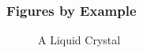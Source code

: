 \documentclass{beamer}
\begin{document}
\begin{frame}[containsverbatim]
    \frametitle{Figures by Example}
    \begin{figure}
        \begin{center} \vspace{-10pt}
            \label{CNematic}
            \caption{A Liquid Crystal} \vspace{-15pt}
        \end{center}
    \end{figure}


\end{frame}
\end{document}
